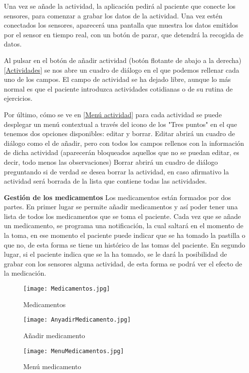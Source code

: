 \documentclass[11pt,spanish]{article}
\begin{document}
Una vez se añade la actividad, la aplicación pedirá al paciente que conecte los sensores, para comenzar a grabar los datos de la actividad. Una vez estén conectados los sensores, aparecerá una pantalla que muestra los datos emitidos por el sensor en tiempo real, con un botón de parar, que detendrá la recogida de datos.
\newline

Al pulsar en el botón de añadir actividad (botón flotante de abajo a la derecha) \ref{Actividades} se nos abre un cuadro de diálogo en el que podemos rellenar cada uno de los campos. El campo de actividad se ha dejado libre, aunque lo más normal es que el paciente introduzca actividades cotidianas o de su rutina de ejercicios.
\newline

Por último, cómo se ve en \ref{Menú actividad} para cada actividad se puede desplegar un menú contextual a través del icono de los "Tres puntos" en el que tenemos dos opciones disponibles: editar y borrar. Editar abrirá un cuadro de diálogo como el de añadir, pero con todos los campos rellenos con la información de dicha actividad (aparecerán bloqueados aquellos que no se puedan editar, es decir, todo menos las observaciones) Borrar abrirá un cuadro de diálogo preguntando si de verdad se desea borrar la actividad, en caso afirmativo la actividad será borrada de la lista que contiene todas las actividades.
\newline

{\bf Gestión de los medicamentos}
\newline
\newline
Los medicamentos están formados por dos partes. En primer lugar se permite añadir medicamentos y así poder tener una lista de todos los medicamentos que se toma el paciente. Cada vez que se añade un medicamento, se programa una notificación, la cual saltará en el momento de la toma, en ese momento el paciente puede indicar que se ha tomado la pastilla o que no, de esta forma se tiene un histórico de las tomas del paciente. En segundo lugar, si el paciente indica que se la ha tomado, se le dará la posibilidad de grabar con los sensores alguna actividad, de esta forma se podrá ver el efecto de la medicación.
\begin{figure}[!htb]
  \texttt{[image: Medicamentos.jpg]}
  \caption{Medicamentos}
  \label{Medicamentos}
\endminipage\hfill
{}
  \texttt{[image: AnyadirMedicamento.jpg]}
  \caption{Añadir medicamento}
  \label{Añadir medicamento}
\endminipage\hfill
{}%
  \texttt{[image: MenuMedicamentos.jpg]}
  \caption{Menú medicamento}
  \label{Menú medicamento}
\endminipage
\end{figure}
\end{document}
